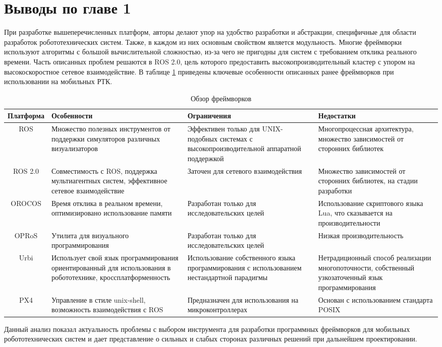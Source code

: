 \section*{Выводы по главе 1}

При разработке вышеперечисленных платформ, авторы делают упор на 
удобство разработки и абстракции, специфичные для области 
разработок робототехнических систем. Также, в каждом из них 
основным свойством является модульность. Многие фреймворки 
используют алгоритмы с большой вычислительной сложностью, из-за 
чего не пригодны для систем с требованием отклика реального 
времени. Часть описанных проблем решаются в ROS 2.0, цель 
которого предоставить высокопроизводительный кластер с упором на 
высокоскоростное сетевое взаимодействие. В таблице 
\ref{tab:frameworks} приведены ключевые особенности описанных 
ранее фреймворков при использовании на мобильных РТК.

\begin{table}
    \caption{\label{tab:frameworks}Обзор фреймворков}
    \begin{center}
        \begin{tabularx}{\textwidth}{|c|X|X|X|}
            \hline
            Платформа & Особенности & Ограничения & Недостатки \\
            \hline
            ROS & Множество полезных инструментов от поддержки симуляторов различных визуализаторов & Эффективен только для UNIX-подобных системах с высокопроизводительной аппаратной поддержкой & Многопроцессная архитектура, множество зависимостей от сторонних библиотек \\
            \hline
            ROS 2.0 & Совместимость с ROS, поддержка мультиагентных систем, эффективное сетевое взаимодействие & Заточен для сетевого взаимодействия & Множество зависимостей от сторонних библиотек, на стадии разработки \\
            \hline
            OROCOS & Время отклика в реальном времени, 
            оптимизировано использование памяти & Разработан 
            только для исследовательских целей & Использование 
            скриптового языка Lua, что сказывается на 
            производительности \\
            \hline
            OPRoS & Утилита для визуального программирования & Разработан только для исследовательских целей & Низкая производительность \\
            \hline
            Urbi & Использует свой язык программирования ориентированный для использования в робототехнике, кроссплатформенность & Использование собственного языка программирования с использованием нестандартной парадигмы & Нетрадиционный способ реализации многопоточности, собственный узкозаточенный язык программирования \\
            \hline
            PX4 & Управление в стиле unix-shell, возможность взаимодействия с ROS & Предназначен для использования на микроконтроллерах & Основан с использованием стандарта POSIX \\
            \hline
        \end{tabularx}
    \end{center}
\end{table}

Данный анализ показал актуальность проблемы с выбором инструмента для разработки программных фреймворков для мобильных робототехнических систем и дает представление о сильных и слабых сторонах различных решений при дальнейшем проектировании. 